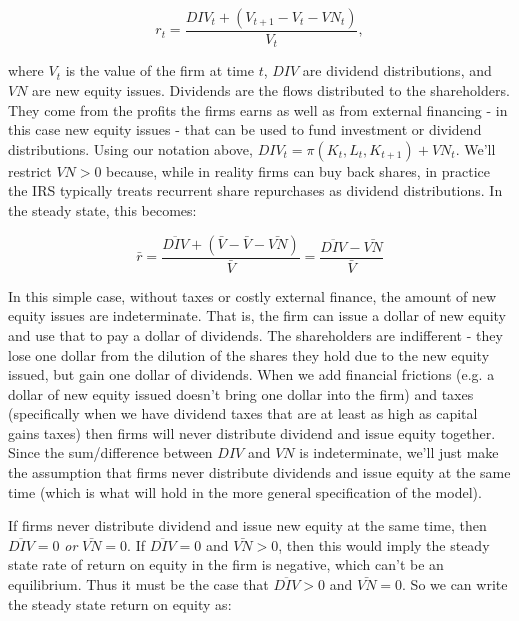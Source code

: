 \documentclass[letterpaper,12pt]{article}
\theoremstyle{definition}
\begin{document}
\begin{spacing}{1.5}
\begin{equation}
\label{eqn:equity_return}
r_{t} = \frac{DIV_{t}+(V_{t+1}-V_{t}-VN_{t})}{V_{t}},
\end{equation} 

\noindent\noindent where $V_{t}$ is the value of the firm at time $t$, $DIV$ are dividend distributions, and $VN$ are new equity issues.  Dividends are the flows distributed to the shareholders.  They come from the profits the firms earns as well as from external financing - in this case new equity issues - that can be used to fund investment or dividend distributions.  Using our notation above, $DIV_{t}=\pi(K_{t},L_{t},K_{t+1})+VN_{t}$.  We'll restrict $VN>0$ because, while in reality firms can buy back shares, in practice the IRS typically treats recurrent share repurchases as dividend distributions.  In the steady state, this becomes:

\begin{equation}
\label{eqn:equity_return}
\bar{r} = \frac{\overline{DIV}+(\bar{V}-\bar{V}-\bar{VN})}{\bar{V}}=\frac{\overline{DIV}-\bar{VN}}{\bar{V}}
\end{equation} 

\noindent\noindent  In this simple case, without taxes or costly external finance, the amount of new equity issues are indeterminate.  That is, the firm can issue a dollar of new equity and use that to pay a dollar of dividends.  The shareholders are indifferent - they lose one dollar from the dilution of the shares they hold due to the new equity issued, but gain one dollar of dividends.  When we add financial frictions (e.g. a dollar of new equity issued doesn't bring one dollar into the firm) and taxes (specifically when we have dividend taxes that are at least as high as capital gains taxes) then firms will never distribute dividend and issue equity together.  Since the sum/difference between $DIV$ and $VN$ is indeterminate, we'll just make the assumption that firms never distribute dividends and issue equity at the same time (which is what will hold in the more general specification of the model).  

If firms never distribute dividend and issue new equity at the same time, then $\overline{DIV}=0$ \emph{or} $\bar{VN}=0$.  If $\overline{DIV}=0$ and $\bar{VN}>0$, then this would imply the steady state rate of return on equity in the firm is negative, which can't be an equilibrium.  Thus it must be the case that $\overline{DIV}>0$ and $\bar{VN}=0$.  So we can write the steady state return on equity as:


\end{spacing}
\end{document}
